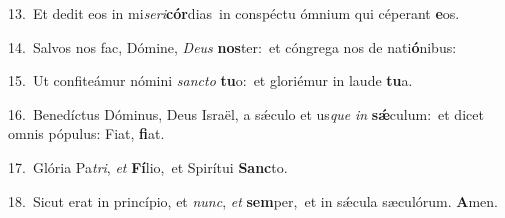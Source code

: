 {\numbfont\textcolor{\numbcolor}{13.}}~Et dedit eos in mi\-\textit{se}\-\textit{ri}\textbf{cór}dias~\star in conspéctu ómnium qui céperant \textbf{e}\-os.\par
{\numbfont\textcolor{\numbcolor}{14.}}~Salvos nos fac, Dómine, \textit{De}\-\textit{us} \textbf{nos}\-ter:~\star et cóngrega nos de nati\-\textbf{ó}\-nibus:\par
{\numbfont\textcolor{\numbcolor}{15.}}~Ut confiteámur nómini \textit{sanc}\-\textit{to} \textbf{tu}\-o:~\star et gloriémur in laude \textbf{tu}\-a.\par
{\numbfont\textcolor{\numbcolor}{16.}}~Benedíctus Dóminus, Deus Israël, a sǽculo et us\textit{que} \textit{in} \textbf{sǽ}\-culum:~\star et dicet omnis pópulus: Fiat, \textbf{fi}\-at.\par
{\numbfont\textcolor{\numbcolor}{17.}}~Glória Pa\-\textit{tri}\-, \textit{et} \textbf{Fí}\-lio,~\star et Spirítui \textbf{Sanc}\-to.\par
{\numbfont\textcolor{\numbcolor}{18.}}~Sicut erat in princípio, et \textit{nunc}\-, \textit{et} \textbf{sem}\-per,~\star et in sǽcula sæculórum. \textbf{A}\-men.\par
